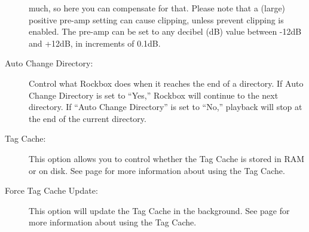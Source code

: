 \begin{description}
{{\begin{description}
            much, so here you can compensate for that. Please note that a 
            (large) positive pre-amp setting can cause clipping, unless 
            prevent clipping is enabled.  The pre-amp can be set to any 
            decibel (dB) value between -12dB and +12dB, in increments of 0.1{}dB.
        \end{description}
        }
    }
    \item[Auto Change Directory: ]Control what Rockbox does when it reaches the end
      of a directory.  If Auto Change Directory is set to ``Yes,'' Rockbox will 
      continue to the next directory.  If ``Auto Change Directory'' is set to ``No,''
      playback will stop at the end of the current directory.
    \item[Tag Cache: ]This option allows you to control whether the Tag Cache is stored
      in RAM or on disk.  See page \pageref{ref:tagcache} for more information about using
      the Tag Cache.
    \item[Force Tag Cache Update: ]This option will update the Tag Cache in the background.  
      See page \pageref{ref:tagcache} for more information about using the Tag Cache.
	\end{description}

